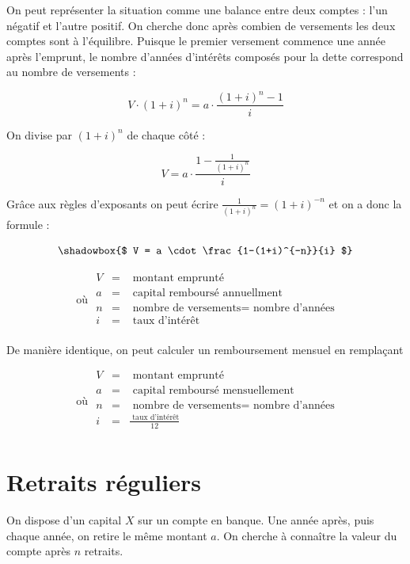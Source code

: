 On peut représenter la situation comme une balance entre deux comptes : l'un négatif et l'autre positif. On cherche donc après combien de versements les deux comptes sont à l'équilibre. Puisque le premier versement commence une année après l'emprunt, le nombre d'années d'intérêts composés pour la dette correspond au nombre de versements :

$$
V \cdot (1+i)^n = a \cdot \frac{(1+i)^n-1}{i}
$$

On divise par $(1+i)^n$ de chaque côté :

$$
V = a \cdot \frac{1-\frac{1}{(1+i)^n}}{i} 
$$

Grâce aux règles d'exposants on peut écrire $\frac{1}{(1+i)^n} = (1+i)^{-n}$ et on a donc la formule :

\begin{equation*}
\shadowbox{$
V = a \cdot \frac{1-(1+i)^{-n}}{i} $}
\end{equation*}

\begin{equation*}
\mbox{ où } 
\begin{array}{lll}
V&=&\mbox{ montant emprunté}\\
a&=&\mbox{ capital remboursé annuellment}\\
n&=&\mbox{ nombre de versements} = \mbox{ nombre d'années}\\
i&=&\mbox{ taux d'intérêt}\\
\end{array}
\end{equation*}

De manière identique, on peut calculer un remboursement mensuel en remplaçant 

\begin{equation*}
\mbox{ où } 
\begin{array}{lll}
V&=&\mbox{ montant emprunté}\\
a&=&\mbox{ capital remboursé mensuellement}\\
n&=&\mbox{ nombre de versements} = \mbox{ nombre d'années}\\
i&=& \frac{\mbox{ taux d'intérêt}}{12}\\
\end{array}
\end{equation*}

\section{Retraits réguliers}

On dispose d'un capital $X$ sur un compte en banque. Une année après, puis chaque année, on retire le même montant $a$. On cherche à connaître la valeur du compte après $n$ retraits.

